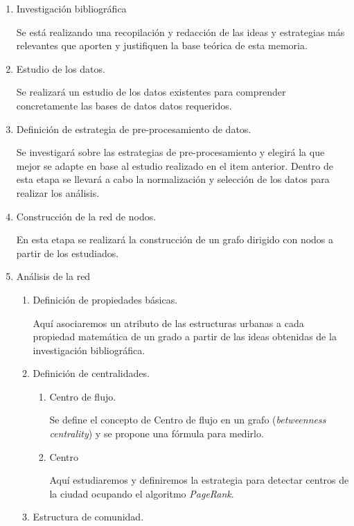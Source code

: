 \documentclass[12pt]{article}
\begin{document}
    \begin{enumerate}
    \item Investigación bibliográfica

    Se está realizando una recopilación y redacción de las ideas y estrategias más relevantes que aporten y justifiquen la base teórica de esta memoria.

    \item Estudio de los datos.

    Se realizará un estudio de los datos existentes para comprender concretamente las bases de datos datos requeridos.  

    \item Definición de estrategia de pre-procesamiento de datos.

    Se investigará sobre las estrategias de pre-procesamiento y elegirá la que mejor se adapte en base al estudio realizado en el item anterior. Dentro de esta etapa se llevará a cabo la normalización y selección de los datos para realizar los análisis.

    \item Construcción de la red de nodos.

    En esta etapa se realizará la construcción de un grafo dirigido con nodos a partir de los estudiados.

    \item Análisis de la red
    \begin{enumerate}
    \item Definición de propiedades básicas.

    Aquí asociaremos un atributo de las estructuras urbanas a cada propiedad matemática de un grado a partir de las ideas obtenidas de la investigación bibliográfica.

    \item Definición de centralidades.
    \begin{enumerate}
    \item Centro de flujo.

    Se define el concepto de Centro de flujo en un grafo (\textit{betweenness centrality}) y se propone una fórmula para medirlo.

    \item Centro

    Aquí estudiaremos y definiremos la estrategia para detectar centros de la ciudad ocupando el algoritmo \textit{PageRank}.

    \end{enumerate}
    \item Estructura de comunidad.


\end{enumerate}
\end{enumerate}
\end{document}

